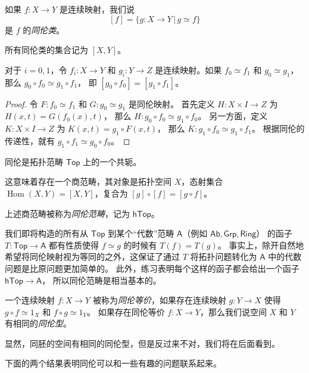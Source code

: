 \documentclass[fontset=none]{Notes}
\DeclareMathOperator\Hom{Hom}
\newcommand{\cat}[1]{\mathsf{#1}}
\begin{document}
\begin{definition}
  如果 $f:X\to Y$ 是连续映射，我们说
  \[
    [f]=\{g:X\to Y\,|\, g\simeq f\}
  \]
  是 $f$ 的\emph{同伦类}。
\end{definition}

所有同伦类的集合记为 $[X,Y]$。

\begin{theorem}
  对于 $i=0,1$，令 $f_i:X\to Y$ 和 $g_i:Y\to Z$ 是连续映射。如果
  $f_0\simeq f_1$ 和 $g_0\simeq g_1$，那么 $g_0\circ f_0\simeq g_1\circ f_1$，
  即 $[g_0\circ f_0]=[g_1\circ f_1]$。
\end{theorem}
\begin{proof}
  令 $F:f_0\simeq f_1$ 和 $G:g_0\simeq g_1$ 是同伦映射。
  首先定义 $H:X\times I\to Z$ 为 $H(x,t)=G(f_0(x),t)$，
  那么 $H:g_0\circ f_0\simeq g_1\circ f_0$。
  另一方面，定义 $K:X\times I\to Z$ 为 $K(x,t)=g_1\circ F(x,t)$，
  那么 $K:g_1\circ f_0\simeq g_1\circ f_1$。
  根据同伦的传递性，就有 $g_1\circ f_1\simeq g_0\circ f_0$。
\end{proof}

\begin{corollary}
  同伦是拓扑范畴 $\cat{Top}$ 上的一个共轭。
\end{corollary}

这意味着存在一个商范畴，其对象是拓扑空间 $X$，态射集合 
$\Hom(X,Y)=[X,Y]$，复合为 $[g]\circ [f]=[g\circ f]$。

\begin{definition}
  上述商范畴被称为\emph{同伦范畴}，记为 $\cat{hTop}$。
\end{definition}

我们即将构造的所有从 $\cat{Top}$ 到某个“代数”范畴 $\cat A$（例如 $\cat{Ab},\cat{Grp},\cat{Ring}$）
的函子 $T:\cat{Top}\to\cat{A}$ 都有性质使得 $f\simeq g$ 的时候有 $T(f)=T(g)$。
事实上，除开自然地希望将同伦映射视为等同的之外，这保证了通过 $T$
将拓扑问题转化为 $\cat A$ 中的代数问题是比原问题更加简单的。
此外，练习表明每个这样的函子都会给出一个函子 $\cat{hTop}\to\cat A$，
所以同伦范畴是相当基本的。

\begin{definition}
  一个连续映射 $f:X\to Y$ 被称为\emph{同伦等价}，如果存在连续映射
  $g:Y\to X$ 使得 $g\circ f\simeq 1_X$ 和 $f\circ g\simeq 1_Y$。
  如果存在同伦等价 $f:X\to Y$，那么我们说空间 $X$ 和 $Y$
  有相同的\emph{同伦型}。
\end{definition}

显然，同胚的空间有相同的同伦型，但是反过来不对，我们将在后面看到。

下面的两个结果表明同伦可以和一些有趣的问题联系起来。
\end{document}
